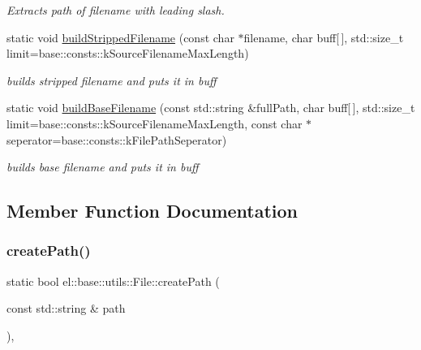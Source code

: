 \begin{DoxyCompactItemize}
\begin{DoxyCompactList}\small\item\em Extracts path of filename with leading slash. \end{DoxyCompactList}\item 
\mbox{\label{classel_1_1base_1_1utils_1_1_file_a38e3b3c72f73de47563b289eff13ae2d}} 
static void \hyperlink{classel_1_1base_1_1utils_1_1_file_a38e3b3c72f73de47563b289eff13ae2d}{build\+Stripped\+Filename} (const char $\ast$filename, char buff\mbox{[}$\,$\mbox{]}, std\+::size\+\_\+t limit=base\+::consts\+::k\+Source\+Filename\+Max\+Length)
\begin{DoxyCompactList}\small\item\em builds stripped filename and puts it in buff \end{DoxyCompactList}\item 
\mbox{\label{classel_1_1base_1_1utils_1_1_file_ad6c3703c16b95bd4992f501380d503b4}} 
static void \hyperlink{classel_1_1base_1_1utils_1_1_file_ad6c3703c16b95bd4992f501380d503b4}{build\+Base\+Filename} (const std\+::string \&full\+Path, char buff\mbox{[}$\,$\mbox{]}, std\+::size\+\_\+t limit=base\+::consts\+::k\+Source\+Filename\+Max\+Length, const char $\ast$seperator=base\+::consts\+::k\+File\+Path\+Seperator)
\begin{DoxyCompactList}\small\item\em builds base filename and puts it in buff \end{DoxyCompactList}\end{DoxyCompactItemize}


\subsection{Member Function Documentation}
\mbox{\label{classel_1_1base_1_1utils_1_1_file_a34fbb5b06201c7e3db71db80e017fb96}} 
\subsubsection{\texorpdfstring{create\+Path()}{createPath()}}
{\footnotesize\ttfamily static bool el\+::base\+::utils\+::\+File\+::create\+Path (\begin{DoxyParamCaption}\item[{const std\+::string \&}]{path }\end{DoxyParamCaption})\hspace{0.3cm}{\ttfamily [inline]}, {\ttfamily [static]}}



